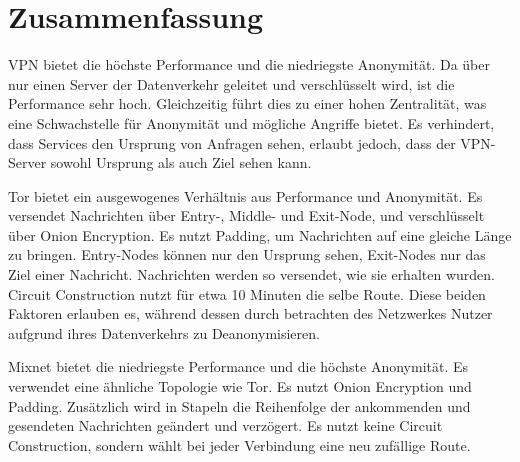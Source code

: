 \section{Zusammenfassung}

VPN bietet die höchste Performance und die niedriegste Anonymität. Da über nur einen Server der Datenverkehr geleitet und verschlüsselt wird, ist die Performance sehr hoch. Gleichzeitig führt dies zu einer hohen Zentralität, was eine Schwachstelle für Anonymität und mögliche Angriffe bietet. Es verhindert, dass Services den Ursprung von Anfragen sehen, erlaubt jedoch, dass der VPN-Server sowohl Ursprung als auch Ziel sehen kann.

Tor bietet ein ausgewogenes Verhältnis aus Performance und Anonymität. Es versendet Nachrichten über Entry-, Middle- und Exit-Node, und verschlüsselt über Onion Encryption. Es nutzt Padding, um Nachrichten auf eine gleiche Länge zu bringen. Entry-Nodes können nur den Ursprung sehen, Exit-Nodes nur das Ziel einer Nachricht. Nachrichten werden so versendet, wie sie erhalten wurden. Circuit Construction nutzt für etwa 10 Minuten die selbe Route. Diese beiden Faktoren erlauben es, während dessen durch betrachten des Netzwerkes Nutzer aufgrund ihres Datenverkehrs zu Deanonymisieren.

Mixnet bietet die niedriegste Performance und die höchste Anonymität. Es verwendet eine ähnliche Topologie wie Tor. Es nutzt Onion Encryption und Padding. Zusätzlich wird in Stapeln die Reihenfolge der ankommenden und gesendeten Nachrichten geändert und verzögert. Es nutzt keine Circuit Construction, sondern wählt bei jeder Verbindung eine neu zufällige Route.